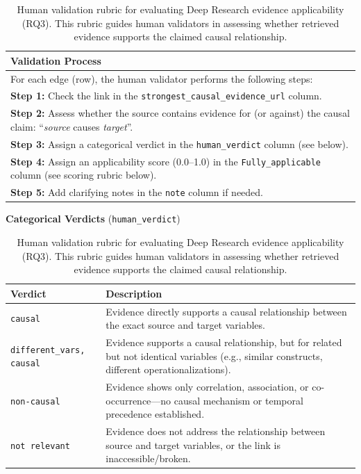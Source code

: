 
\begin{table}[htbp]
\centering
\caption[Human validation rubric for RQ3]{Human validation rubric for evaluating Deep Research evidence applicability (RQ3). This rubric guides human validators in assessing whether retrieved evidence supports the claimed causal relationship.}
\label{tab:human-validation-rubric-rq3}

\small
\begin{tabular}{p{}}
\toprule
\textbf{Validation Process} \\
\midrule
For each edge (row), the human validator performs the following steps: \\[0.5em]

\textbf{Step 1:} Check the link in the \texttt{strongest\_causal\_evidence\_url} column. \\[0.3em]

\textbf{Step 2:} Assess whether the source contains evidence for (or against) the causal claim: ``\textit{source} causes \textit{target}''. \\[0.3em]

\textbf{Step 3:} Assign a categorical verdict in the \texttt{human\_verdict} column (see below). \\[0.3em]

\textbf{Step 4:} Assign an applicability score (0.0--1.0) in the \texttt{Fully\_applicable} column (see scoring rubric below). \\[0.3em]

\textbf{Step 5:} Add clarifying notes in the \texttt{note} column if needed. \\
\bottomrule
\end{tabular}

\vspace{1.5em}

\textbf{Categorical Verdicts} (\texttt{human\_verdict})

\vspace{0.5em}

\begin{tabular}{|p{3.5cm}|p{10cm}|}
\hline
\textbf{Verdict} & \textbf{Description} \\
\hline
\texttt{causal} & Evidence directly supports a causal relationship between the exact source and target variables. \\
\hline
\texttt{different\_vars, causal} & Evidence supports a causal relationship, but for related but not identical variables (e.g., similar constructs, different operationalizations). \\
\hline
\texttt{non-causal} & Evidence shows only correlation, association, or co-occurrence---no causal mechanism or temporal precedence established. \\
\hline
\texttt{not relevant} & Evidence does not address the relationship between source and target variables, or the link is inaccessible/broken. \\
\hline
\end{tabular}


\end{table}
